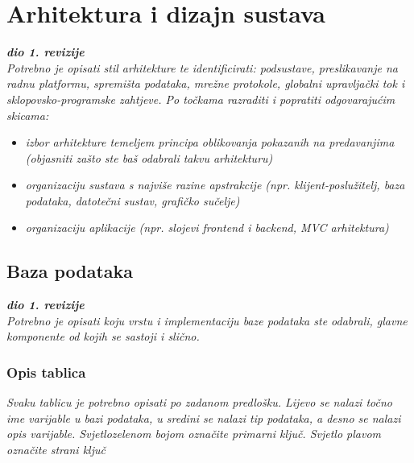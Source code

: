 \chapter{Arhitektura i dizajn sustava}
		
		\textbf{\textit{dio 1. revizije}}\\

		\textit{ Potrebno je opisati stil arhitekture te identificirati: podsustave, preslikavanje na radnu platformu, spremišta podataka, mrežne protokole, globalni upravljački tok i sklopovsko-programske zahtjeve. Po točkama razraditi i popratiti odgovarajućim skicama:}
	\begin{itemize}
		\item 	\textit{izbor arhitekture temeljem principa oblikovanja pokazanih na predavanjima (objasniti zašto ste baš odabrali takvu arhitekturu)}
		\item 	\textit{organizaciju sustava s najviše razine apstrakcije (npr. klijent-poslužitelj, baza podataka, datotečni sustav, grafičko sučelje)}
		\item 	\textit{organizaciju aplikacije (npr. slojevi frontend i backend, MVC arhitektura) }		
	\end{itemize}

	
		

		

				
		\section{Baza podataka}
			
			\textbf{\textit{dio 1. revizije}}\\
			
		\textit{Potrebno je opisati koju vrstu i implementaciju baze podataka ste odabrali, glavne komponente od kojih se sastoji i slično.}
		
			\subsection{Opis tablica}
			

				\textit{Svaku tablicu je potrebno opisati po zadanom predlošku. Lijevo se nalazi točno ime varijable u bazi podataka, u sredini se nalazi tip podataka, a desno se nalazi opis varijable. Svjetlozelenom bojom označite primarni ključ. Svjetlo plavom označite strani ključ}
				

